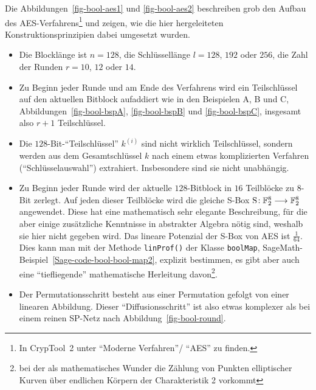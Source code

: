 \begin{refsegment}
Die Abbildungen~\ref{fig-bool-aes1} und \ref{fig-bool-aes2}
beschreiben grob den Aufbau des AES-Verfahrens\footnote{%
  In CrypTool~2 unter "`Moderne Verfahren"'/ "`AES"' zu finden.
} und zeigen, wie die hier
hergeleiteten Konstruktionsprinzipien dabei umgesetzt wurden.
\begin{itemize}
   \item Die Blocklänge ist $n = 128$, die Schlüssellänge $l = 128$,
         $192$ oder $256$, die Zahl der Runden $r = 10$, $12$ oder $14$.
   \item Zu Beginn jeder Runde und am Ende des Verfahrens wird ein
         Teilschlüssel auf den aktuellen Bitblock aufaddiert wie in
         den Beispielen A, B und C, Abbildungen~\ref{fig-bool-bspA},
         \ref{fig-bool-bspB} und \ref{fig-bool-bspC}, insgesamt also
         $r+1$ Teilschlüssel.
   \item Die $128$-Bit-"`Teilschlüssel"' $k^{(i)}$ sind nicht wirklich
         Teilschlüssel, sondern werden aus dem Gesamtschlüssel $k$
         nach einem etwas komplizierten Verfahren ("`Schlüsselauswahl"')
         extrahiert. Insbesondere sind sie nicht unabhängig.
   \item Zu Beginn jeder Runde wird der aktuelle $128$-Bitblock
         in $16$ Teilblöcke zu $8$-Bit zerlegt. Auf jeden dieser Teilblöcke
         wird die gleiche S-Box $\mathrm{S}\!: \mathbb{F}_2^8 \longrightarrow \mathbb{F}_2^8$
         angewendet. Diese hat eine mathematisch sehr elegante Beschreibung,
         für die aber einige zusätzliche Kenntnisse in abstrakter Algebra
         nötig sind, weshalb sie hier nicht gegeben wird.
         Das lineare Potenzial der S-Box von AES ist $\frac{1}{64}$.
         Dies kann man mit der Methode {\tt linProf()} der Klasse
         {\tt boolMap},
         SageMath-Beispiel~\ref{Sage-code-bool-bool-map2},
         explizit bestimmen, es gibt aber auch eine "`tiefliegende"'
         mathematische Herleitung davon\footnote{%
         bei der als mathematisches Wunder die Zählung von Punkten
         elliptischer Kurven
         über endlichen Körpern
         der Charakteristik 2 vorkommt
         }.
   \item Der Permutationsschritt besteht aus einer Permutation gefolgt
         von einer linearen Abbildung. Dieser "`Diffusionsschritt"'
         ist also etwas komplexer als bei einem reinen SP-Netz
         nach Abbildung~\ref{fig-bool-round}.
\end{itemize}


\end{refsegment}
